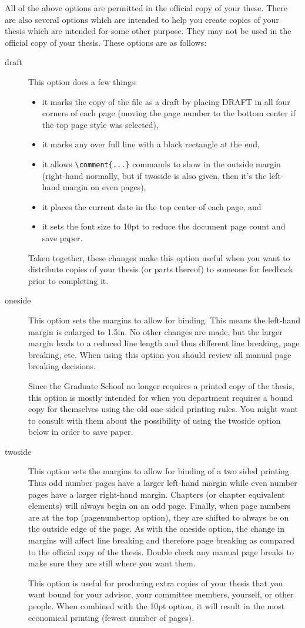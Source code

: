 All of the above options are permitted in the official copy of your these.  There are also several options which are intended to help you create copies of your thesis which are intended for some other purpose.  They may not be used in the official copy of your thesis.  These options are as follows:

\begin{description}
\item[draft]{This option does a few things:
	\begin{itemize}
	\item{it marks the copy of the file as a draft by placing DRAFT in all four corners of each page (moving the page number to the bottom center if the top page style was selected),}
	\item{it marks any over full line with a black rectangle at the end,}
	\item{it allows \verb=\comment{...}= commands to show in the outside margin (right-hand normally, but if twoside is also given, then it's the left-hand margin on even pages),}
	\item{it places the current date in the top center of each page, and}
	\item{it sets the font size to 10pt to reduce the document page count and save paper.}
	\end{itemize}
Taken together, these changes make this option useful when you want to distribute copies of your thesis (or parts thereof) to someone for feedback prior to completing it.}
\item[oneside]{This option sets the margins to allow for binding.  This means the left-hand margin is enlarged to 1.5in.  No other changes are made, but the larger margin leads to a reduced line length and thus different line breaking, page breaking, etc.  When using this option you should review all manual page breaking decisions.

Since the Graduate School no longer requires a printed copy of the thesis, this option is mostly intended for when you department requires a bound copy for themselves using the old one-sided printing rules.  You might want to consult with them about the possibility of using the twoside option below in order to save paper.}
\item[twoside]{This option sets the margins to allow for binding of a two sided printing.  Thus odd number pages have a larger left-hand margin while even number pages have a larger right-hand margin.  Chapters (or chapter equivalent elements) will always begin on an odd page.  Finally, when page numbers are at the top (pagenumbertop option), they are shifted to always be on the outside edge of the page.  As with the oneside option, the change in margins will affect line breaking and therefore page breaking as compared to the official copy of the thesis.  Double check any manual page breaks to make sure they are still where you want them.

This option is useful for producing extra copies of your thesis that you want bound for your advisor, your committee members, yourself, or other people.  When combined with the 10pt option, it will result in the most economical printing (fewest number of pages).}
\end{description}
